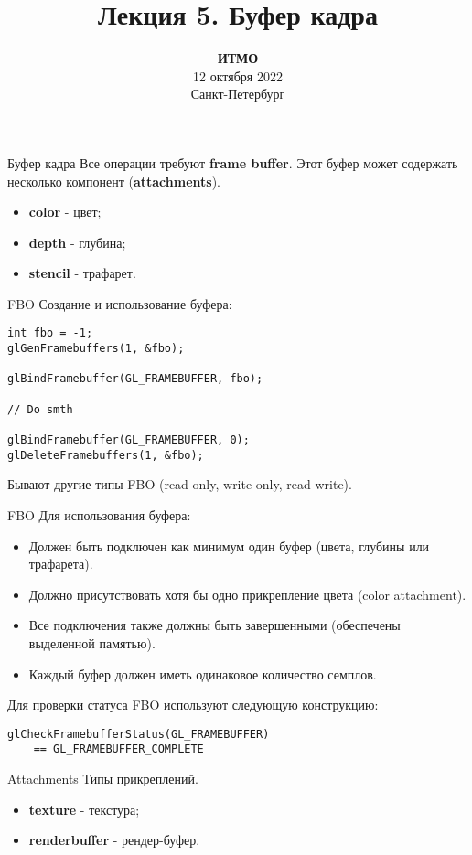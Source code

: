 \documentclass[aspectration=1610,t]{beamer}
\title{Лекция 5. Буфер кадра}
\date{
   \textbf{ИТМО}\\
   12 октября 2022\\
   Санкт-Петербург
}
\begin{document}
\begin{frame}
  \titlepage
\end{frame}

\begin{frame}[fragile]{Буфер кадра}
    Все операции требуют {\bf frame buffer}. Этот буфер может содержать несколько компонент ({\bf attachments}).
    \begin{itemize}
        \item {\bf color} - цвет;
        \item {\bf depth} - глубина;
        \item {\bf stencil} - трафарет.
    \end{itemize}
\end{frame}

\begin{frame}[fragile]{FBO}
   Создание и использование буфера:
            {\small \begin{lstlisting}
int fbo = -1;
glGenFramebuffers(1, &fbo);

glBindFramebuffer(GL_FRAMEBUFFER, fbo);

// Do smth

glBindFramebuffer(GL_FRAMEBUFFER, 0);
glDeleteFramebuffers(1, &fbo);
            \end{lstlisting}}
    Бывают другие типы FBO (read-only, write-only, read-write).
\end{frame}

\begin{frame}[fragile]{FBO}
    Для использования буфера:
    \begin{itemize}
        \item Должен быть подключен как минимум один буфер (цвета, глубины или трафарета).
        \item Должно присутствовать хотя бы одно прикрепление цвета (color attachment).
        \item Все подключения также должны быть завершенными (обеспечены выделенной памятью).
        \item Каждый буфер должен иметь одинаковое количество семплов.
    \end{itemize}
    Для проверки статуса FBO используют следующую конструкцию:
    {\small \begin{lstlisting}
glCheckFramebufferStatus(GL_FRAMEBUFFER)
    == GL_FRAMEBUFFER_COMPLETE
    \end{lstlisting}}
\end{frame}

\begin{frame}[fragile]{Attachments}
    Типы прикреплений.
    \begin{itemize}
        \item {\bf texture} - текстура;
        \item {\bf renderbuffer} - рендер-буфер.
    \end{itemize}
\end{frame}
\end{document}
